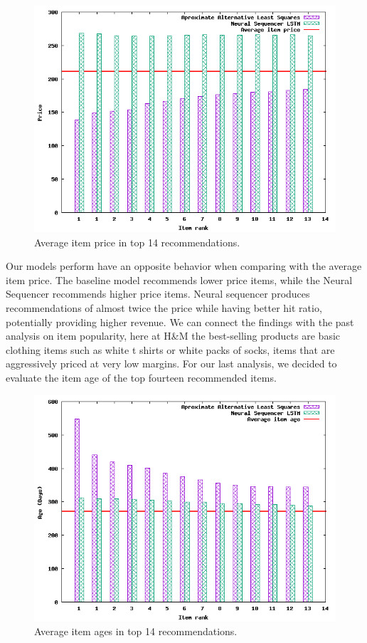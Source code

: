 \documentclass{kththesis}
\begin{document}
\begin{figure}[H]
    \centering
    \includegraphics[scale=0.75]{charts/price.png}
    \caption{Average item price in top 14 recommendations.}
\end{figure}

Our models perform have an opposite behavior when comparing with the average item price. The baseline model recommends lower price items, while the Neural Sequencer recommends higher price items. Neural sequencer produces recommendations of almost twice the price while having better hit ratio, potentially providing higher revenue. We can connect the findings with the past analysis on item popularity, here at H&M the best-selling products are basic clothing items such as white t shirts or white packs of socks, items that are aggressively priced at very low margins. For our last analysis, we decided to evaluate the item age of the top fourteen recommended items.

\begin{figure}[H]
    \centering
    \includegraphics[scale=0.75]{charts/ages.png}
    \caption{Average item ages in top 14 recommendations.}
\end{figure}
\end{document}
